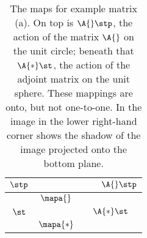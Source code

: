 \begin{table}[h]
\caption[The maps for example matrix (a)]{The maps for example matrix (a). On top is $\A{}\stp$, the action of the matrix $\A{}$ on the unit circle; beneath that $\A{*}\st$, the action of the adjoint matrix on the unit sphere. These mappings are onto, but not one-to-one. In the image in the lower right-hand corner shows the shadow of the image projected onto the bottom plane.}
\begin{center}
\begin{tabular}{ccc}
%
  $\stp$ & & $\qquad\A{} \stp$ \\\hline
%
  \raisebox{-0.5\height}{\includegraphics[ width = 2.000in ] {images/ftola/"map unit sphere"}} 
    \qquad & $\mapa{}$ & \quad
  \raisebox{-0.5\height}{\includegraphics[ width = 2.000in ] {images/ftola/"map a231 A"}} \\[100pt]
%
  $\st$ && $\A{*} \st$ \\\hline
%
  \raisebox{-0.5\height}{\includegraphics[ width = 2.000in ] {images/ftola/"map unit circle"}} 
    \qquad & $\mapa{*}$ & \quad
  \raisebox{-0.5\height}{\includegraphics[ width = 2.000in ] {images/ftola/"map a231 As"}}
%
\end{tabular}
\end{center}
\label{tab:ftola:maps:(a)}
\end{table}%


\endinput